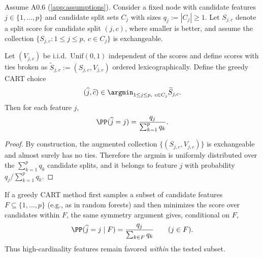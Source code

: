 \begin{lemma}
\label{lem:cart-proportional-selection}
Assume A0.6 (\cref{app:assumptions}). Consider a fixed node with candidate
features $j \in \{1,\dots,p\}$ and candidate split sets $C_j$ with sizes
$q_j := |C_j| \ge 1$. Let $S_{j,c}$ denote a split score for candidate split
$(j,c)$, where smaller is better, and assume the collection
$\{S_{j,c} : 1 \le j \le p,\ c \in C_j\}$ is exchangeable.

Let $(V_{j,c})$ be i.i.d.\ $\mathrm{Unif}(0,1)$ independent of the scores and
define scores with ties broken as $\widetilde S_{j,c} := (S_{j,c}, V_{j,c})$ ordered
lexicographically. Define the greedy CART choice
%
\begin{equation}
  (\widehat j, \widehat c) \in \argmin_{1 \le j \le p,\ c \in C_j} \widetilde S_{j,c}.
\end{equation}
%
Then for each feature $j$,
%
\begin{equation}
  \PP(\widehat j = j) = \frac{q_j}{\sum_{k=1}^p q_k}.
\end{equation}
\end{lemma}

\begin{proof}
By construction, the augmented collection $\{(S_{j,c},V_{j,c})\}$ is
exchangeable and almost surely has no ties. Therefore the argmin is uniformly
distributed over the $\sum_{k=1}^p q_k$ candidate splits, and it belongs to
feature $j$ with probability $q_j/\sum_{k=1}^p q_k$.
\end{proof}

\begin{remark}
If a greedy CART method first samples a subset of candidate features
$F \subseteq \{1,\dots,p\}$ (e.g., as in random forests) and then minimizes the
score over candidates within $F$, the same symmetry argument gives, conditional
on $F$,
%
\begin{equation}
  \PP(\widehat j = j \mid F) = \frac{q_j}{\sum_{k \in F} q_k} \qquad (j \in F).
\end{equation}
%
Thus high-cardinality features remain favored \emph{within} the tested subset.
\end{remark}
